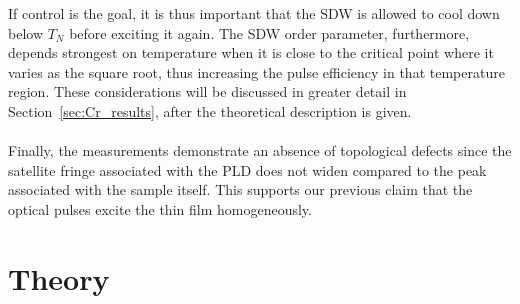 If control is the goal, it is thus important that the SDW is allowed to cool down below $T_N$ before exciting it again.
The SDW order parameter, furthermore, depends strongest on temperature when it is close to the critical point where it varies as the square root, thus increasing the pulse efficiency in that temperature region.
These considerations will be discussed in greater detail in Section~\ref{sec:Cr_results}, after the theoretical description is given.
\\\\
Finally, the measurements demonstrate an absence of topological defects since the satellite fringe associated with the PLD does not widen compared to the peak associated with the sample itself.
This supports our previous claim that the optical pulses excite the thin film homogeneously. 
\section{Theory}


